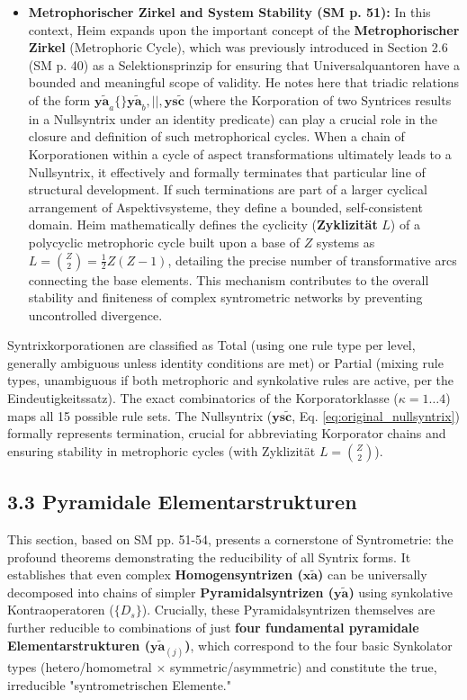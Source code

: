 \documentclass[12pt]{article}
\newcommand{\syntrix}{\bm{y\widetilde{a}}}
\newcommand{\homogeneoussyntrix}{\bm{x\widetilde{a}}}
\newcommand{\nullsyntrix}{\bm{ys\widetilde{c}}}
\newcommand{\elementarstruktur}{\bm{y\widetilde{a}}_{(j)}}
\begin{document}
\begin{itemize}
    \item \textbf{Metrophorischer Zirkel and System Stability (SM p. 51):}
    In this context, Heim expands upon the important concept of the \textbf{Metrophorischer Zirkel} (Metrophoric Cycle), which was previously introduced in Section 2.6 (SM p. 40) as a Selektionsprinzip for ensuring that Universalquantoren have a bounded and meaningful scope of validity. He notes here that triadic relations of the form \( \syntrix_a \{\} \syntrix_b, ||, \nullsyntrix \) (where the Korporation of two Syntrices results in a Nullsyntrix under an identity predicate) can play a crucial role in the closure and definition of such metrophorical cycles. When a chain of Korporationen within a cycle of aspect transformations ultimately leads to a Nullsyntrix, it effectively and formally terminates that particular line of structural development. If such terminations are part of a larger cyclical arrangement of Aspektivsysteme, they define a bounded, self-consistent domain. Heim mathematically defines the cyclicity (\textbf{Zyklizität} \( L \)) of a polycyclic metrophoric cycle built upon a base of \(Z\) systems as \( L = \binom{Z}{2} = \frac{1}{2}Z(Z-1) \), detailing the precise number of transformative arcs connecting the base elements. This mechanism contributes to the overall stability and finiteness of complex syntrometric networks by preventing uncontrolled divergence.
\end{itemize}

Syntrixkorporationen are classified as Total (using one rule type per level, generally ambiguous unless identity conditions are met) or Partial (mixing rule types, unambiguous if both metrophoric and synkolative rules are active, per the Eindeutigkeitssatz). The exact combinatorics of the Korporatorklasse (\(\kappa=1 \dots 4\)) maps all 15 possible rule sets. The Nullsyntrix (\(\nullsyntrix\), Eq. \eqref{eq:original_nullsyntrix}) formally represents termination, crucial for abbreviating Korporator chains and ensuring stability in metrophoric cycles (with Zyklizität \( L = \binom{Z}{2} \)).

\subsection{3.3 Pyramidale Elementarstrukturen}
\label{sec:elementarstrukturen}

This section, based on SM pp. 51-54, presents a cornerstone of Syntrometrie: the profound theorems demonstrating the reducibility of all Syntrix forms. It establishes that even complex \textbf{Homogensyntrizen (\(\homogeneoussyntrix\))} can be universally decomposed into chains of simpler \textbf{Pyramidalsyntrizen (\(\syntrix\))} using synkolative Kontraoperatoren (\(\{D_s\}\)). Crucially, these Pyramidalsyntrizen themselves are further reducible to combinations of just \textbf{four fundamental pyramidale Elementarstrukturen (\(\elementarstruktur\))}, which correspond to the four basic Synkolator types (hetero/homometral \( \times \) symmetric/asymmetric) and constitute the true, irreducible "syntrometrischen Elemente."
\end{document}
